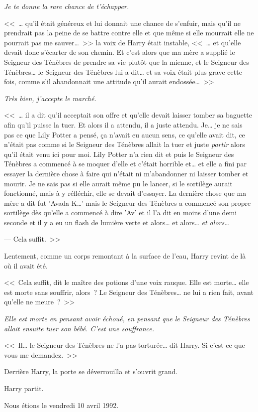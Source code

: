 \emph{Je te donne la rare chance de t'échapper.}

<<~… qu'il était généreux et lui donnait une chance de s'enfuir, mais qu'il ne prendrait pas la peine de se battre contre elle et que même si elle mourrait elle ne pourrait pas me sauver…~>> la voix de Harry était instable, <<~… et qu'elle devait donc s'écarter de son chemin. Et c'est alors que ma mère a supplié le Seigneur des Ténèbres de prendre sa vie plutôt que la mienne, et le Seigneur des Ténèbres… le Seigneur des Ténèbres lui a dit… et sa voix était plus grave cette fois, comme s'il abandonnait une attitude qu'il aurait endossée…~>>

\emph{Très bien, j'accepte le marché.}

<<~… il a dit qu'il acceptait son offre et qu'elle devait laisser tomber sa baguette afin qu'il puisse la tuer. Et alors il a attendu, il a juste attendu. Je… je ne sais pas ce que Lily Potter a pensé, ça n'avait eu aucun sens, ce qu'elle avait dit, ce n'était pas comme si le Seigneur des Ténèbres allait la tuer et juste \emph{partir} alors qu'il était venu ici pour moi. Lily Potter n'a rien dit et puis le Seigneur des Ténèbres a commencé à se moquer d'elle et c'était horrible et… et elle a fini par essayer la dernière chose à faire qui n'était ni m'abandonner ni laisser tomber et mourir. Je ne sais pas si elle aurait même pu le lancer, si le sortilège aurait fonctionné, mais à y réfléchir, elle se devait d'essayer. La dernière chose que ma mère a dit fut 'Avada K…' mais le Seigneur des Ténèbres a commencé son propre sortilège dès qu'elle a commencé à dire 'Av' et il l'a dit en moins d'une demi seconde et il y a eu un flash de lumière verte et alors… et alors… \emph{et alors…}

--- Cela suffit.~>>

Lentement, comme un corps remontant à la surface de l'eau, Harry revint de là où il avait été.

<<~Cela suffit, dit le maître des potions d'une voix rauque. Elle est morte… elle est morte sans souffrir, alors~? Le Seigneur des Ténèbres… ne lui a rien fait, avant qu'elle ne meure~?~>>

\emph{Elle est morte en pensant avoir échoué, en pensant que le Seigneur des Ténèbres allait ensuite tuer son bébé. C'est une souffrance.}

<<~Il… le Seigneur des Ténèbres ne l'a pas torturée… dit Harry. Si c'est ce que vous me demandez.~>>

Derrière Harry, la porte se déverrouilla et s'ouvrit grand.

Harry partit.

Nous étions le vendredi 10 avril 1992. 

